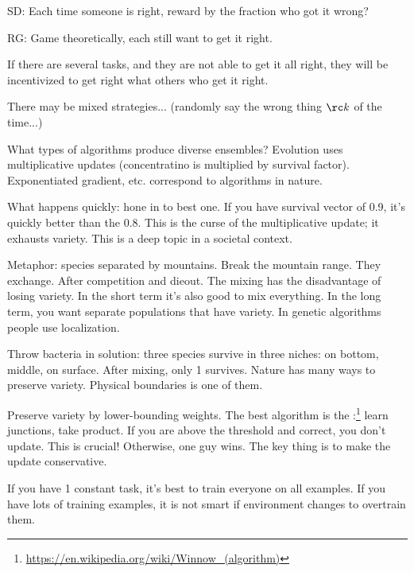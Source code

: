 

SD: Each time someone is right, reward by the fraction who got it wrong?

RG: Game theoretically, each still want to get it right.

If there are several tasks, and they are not able to get it all right, they will be incentivized to get right what others who get it right.

There may be mixed strategies... (randomly say the wrong thing $\rc k$ of the time...)

What types of algorithms produce diverse ensembles?
Evolution uses multiplicative updates (concentratino is multiplied by survival factor). Exponentiated gradient, etc. correspond to algorithms in nature.

What happens quickly: hone in to best one. If you have survival vector of 0.9, it's quickly better than the 0.8. This is the curse of the multiplicative update; it exhausts variety. This is a deep topic in a societal context.


Metaphor: species separated by mountains. Break the mountain range. They exchange. After competition and dieout. The mixing has the disadvantage of losing variety. In the short term it's also good to mix everything. In the long term, you want separate populations that have variety. In genetic algorithms people use localization. 

Throw bacteria in solution: three species survive in three niches: on bottom, middle, on surface. After mixing, only 1 survives. Nature has many ways to preserve variety. Physical boundaries is one of them.

Preserve variety by lower-bounding weights. The best algorithm is the :\footnote{\url{https://en.wikipedia.org/wiki/Winnow_(algorithm)}} learn junctions, take product. If you are above the threshold and correct, you don't update. This is crucial! Otherwise, one guy wins. The key thing is to make the update conservative.

If you have 1 constant task, it's best to train everyone on all examples. 
If you have lots of training examples, it is not smart if environment changes to overtrain them.

